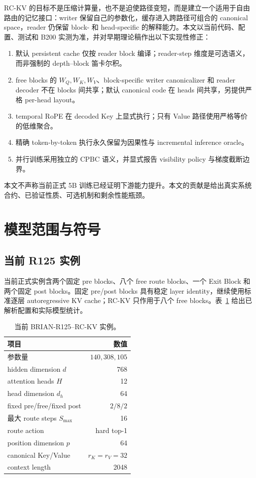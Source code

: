 \documentclass[UTF8,twocolumn,10pt,a4paper]{ctexart}
\newcommand{\RCKV}{\textsf{RC-KV}}
\newcommand{\CPBC}{\textsf{CPBC}}
\begin{document}
\RCKV{} 的目标不是压缩计算量，也不是迫使路径变短，而是建立一个适用于自由路由的记忆接口：writer 保留自己的参数化，缓存进入跨路径可组合的 canonical space，reader 仍保留 block- 和 head-specific 的解释能力。本文以当前代码、配置、测试和 B200 实测为准，并对早期理论稿作出以下实现性修正：

\begin{enumerate}
  \item 默认 persistent cache 仅按 reader block 编译；reader-step 维度是可选语义，而非强制的 depth--block 笛卡尔积。
  \item free blocks 的 $W_Q,W_K,W_V$、block-specific writer canonicalizer 和 reader decoder 不在 blocks 间共享；默认 canonical code 在 heads 间共享，另提供严格 per-head layout。
  \item temporal RoPE 在 decoded Key 上显式执行；只有 Value 路径使用严格等价的低维聚合。
  \item 精确 token-by-token 执行永久保留为因果性与 incremental inference oracle。
  \item 并行训练采用独立的 \CPBC{} 语义，并显式报告 visibility policy 与梯度截断边界。
\end{enumerate}

本文不声称当前正式 5B 训练已经证明下游能力提升。本文的贡献是给出真实系统合约、已验证性质、可选机制和剩余性能瓶颈。

\section{模型范围与符号}
\subsection{当前 R125 实例}
当前正式实例含两个固定 pre blocks、八个 free route blocks、一个 Exit Block 和两个固定 post blocks。固定 pre/post blocks 具有稳定 layer identity，继续使用标准逐层 autoregressive KV cache；\RCKV{} 只作用于八个 free blocks。表~\ref{tab:scope} 给出已解析配置和实际模型统计。

\begin{table}[t]
\centering
\caption{当前 BRIAN-R125--\RCKV{} 实例。}
\label{tab:scope}
\small
\begin{tabular}{lr}
\toprule
项目 & 数值 \\
\midrule
参数量 & $140{,}308{,}105$ \\
hidden dimension $d$ & 768 \\
attention heads $H$ & 12 \\
head dimension $d_h$ & 64 \\
fixed pre/free/fixed post & $2/8/2$ \\
最大 route steps $S_{\max}$ & 16 \\
route action & hard top-1 \\
position dimension $p$ & 64 \\
canonical Key/Value & $r_K=r_V=32$ \\
context length & 2048 \\
\bottomrule
\end{tabular}
\end{table}
\end{document}

